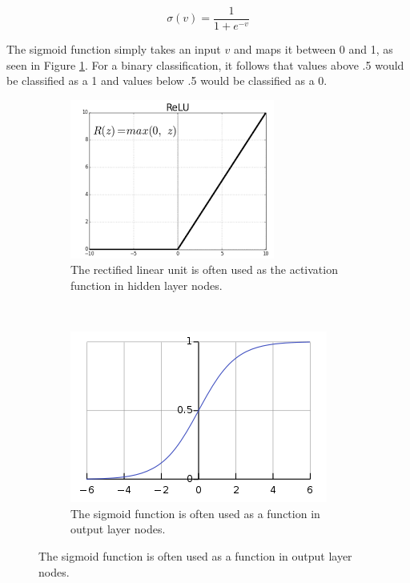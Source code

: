 \documentclass[12pt]{article}
\begin{document}
$$\sigma(v) = \frac{1}{1+e^{-v}}$$

The sigmoid function simply takes an input $v$ and maps it between 0 and 1, as seen in Figure \ref{sigmoid}. For a binary classification, it follows that values above .5 would be classified as a 1 and values below .5 would be classified as a 0.

\begin{figure}[t!]
	\centering
	\begin{subfigure}[t]{0.5\textwidth}
		\centering
		\includegraphics[width=\linewidth]{relu.png}
		\caption{The rectified linear unit is often used as the activation function in hidden layer nodes.}
	\end{subfigure}%
	~ 
	\begin{subfigure}[t]{0.5\textwidth}
		\centering
		\includegraphics[width=\linewidth]{sigmoid.png}
		\caption{The sigmoid function is often used as a function in output layer nodes.}
		\label{sigmoid}
		
	\end{subfigure}

	\label{sigrelu}
\end{figure}
\end{document}
